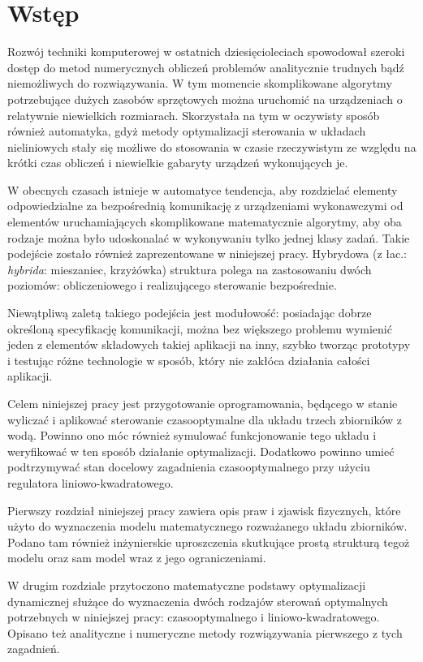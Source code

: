 \chapter*{Wstęp}

Rozwój techniki komputerowej w ostatnich dziesięcioleciach spowodował szeroki dostęp do metod numerycznych obliczeń problemów analitycznie trudnych bądź niemożliwych do rozwiązywania. W tym momencie skomplikowane algorytmy potrzebujące dużych zasobów sprzętowych można uruchomić na urządzeniach o relatywnie niewielkich rozmiarach.
Skorzystała na tym w oczywisty sposób również automatyka, gdyż metody optymalizacji sterowania w układach nieliniowych stały się możliwe do stosowania w czasie rzeczywistym ze względu na krótki czas obliczeń i niewielkie gabaryty urządzeń wykonujących je.

W obecnych czasach istnieje w automatyce tendencja, aby rozdzielać elementy odpowiedzialne za bezpośrednią komunikację z urządzeniami wykonawczymi od elementów uruchamiających skomplikowane matematycznie algorytmy, aby oba rodzaje można było udoskonalać w wykonywaniu tylko jednej klasy zadań.
Takie podejście zostało również zaprezentowane w niniejszej pracy. Hybrydowa (z łac.: \emph{hybrida}: mieszaniec, krzyżówka) struktura polega na zastosowaniu dwóch poziomów: obliczeniowego i realizującego sterowanie bezpośrednie. 

Niewątpliwą zaletą takiego podejścia jest modułowość: posiadając dobrze określoną specyfikację komunikacji, można bez większego problemu wymienić jeden z elementów składowych takiej aplikacji na inny, szybko tworząc prototypy i testując różne technologie w sposób, który nie zakłóca działania całości aplikacji.

Celem niniejszej pracy jest przygotowanie oprogramowania, będącego w stanie wyliczać i aplikować sterowanie czasooptymalne dla układu trzech zbiorników z wodą. Powinno ono móc również symulować funkcjonowanie tego układu i weryfikować w ten sposób działanie optymalizacji. Dodatkowo powinno umieć podtrzymywać stan docelowy zagadnienia czasooptymalnego przy użyciu regulatora liniowo-kwadratowego.

Pierwszy rozdział niniejszej pracy zawiera opis praw i zjawisk fizycznych, które użyto do wyznaczenia modelu matematycznego rozważanego układu zbiorników. Podano tam również inżynierskie uproszczenia skutkujące prostą strukturą tegoż modelu oraz sam model wraz z jego ograniczeniami.

W drugim rozdziale przytoczono matematyczne podstawy optymalizacji dynamicznej służące do wyznaczenia dwóch rodzajów sterowań optymalnych potrzebnych w niniejszej pracy: czasooptymalnego i liniowo-kwadratowego. Opisano też analityczne i numeryczne metody rozwiązywania pierwszego z tych zagadnień.


